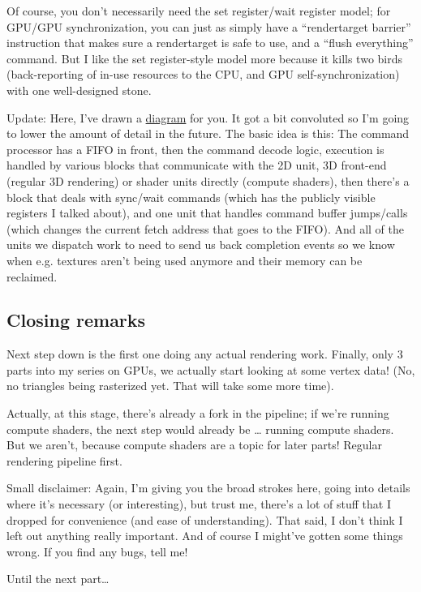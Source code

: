 \documentclass[12pt]{article}
\begin{document}
Of course, you don’t necessarily need the set register/wait register model; for GPU/GPU synchronization, you can just as simply have a “rendertarget barrier” instruction that makes sure a rendertarget is safe to use, and a “flush everything” command. But I like the set register-style model more because it kills two birds (back-reporting of in-use resources to the CPU, and GPU self-synchronization) with one well-designed stone.

Update: Here, I’ve drawn a \href{http://www.farbrausch.de/\~fg/gpu/command\_processor.jpg}{diagram} for you. It got a bit convoluted so I’m going to lower the amount of detail in the future. The basic idea is this: The command processor has a FIFO in front, then the command decode logic, execution is handled by various blocks that communicate with the 2D unit, 3D front-end (regular 3D rendering) or shader units directly (compute shaders), then there’s a block that deals with sync/wait commands (which has the publicly visible registers I talked about), and one unit that handles command buffer jumps/calls (which changes the current fetch address that goes to the FIFO). And all of the units we dispatch work to need to send us back completion events so we know when e.g. textures aren’t being used anymore and their memory can be reclaimed.

\subsection{Closing remarks}
\label{sec:orge59f4b1}


Next step down is the first one doing any actual rendering work. Finally, only 3 parts into my series on GPUs, we actually start looking at some vertex data! (No, no triangles being rasterized yet. That will take some more time).

Actually, at this stage, there’s already a fork in the pipeline; if we’re running compute shaders, the next step would already be … running compute shaders. But we aren’t, because compute shaders are a topic for later parts! Regular rendering pipeline first.

Small disclaimer: Again, I’m giving you the broad strokes here, going into details where it’s necessary (or interesting), but trust me, there’s a lot of stuff that I dropped for convenience (and ease of understanding). That said, I don’t think I left out anything really important. And of course I might’ve gotten some things wrong. If you find any bugs, tell me!

Until the next part…
\end{document}
